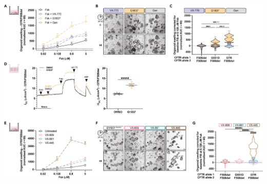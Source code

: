 \begin{center}
\includegraphics[width=\textwidth]{figures/I37R/rectal_organoids_response.jpg}
\end{center}
